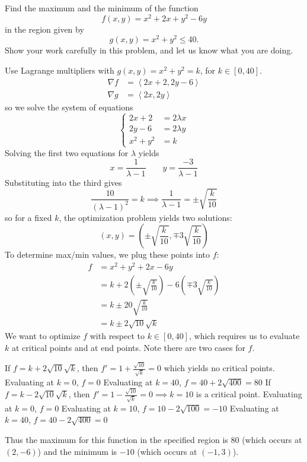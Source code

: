 \documentclass[12pt,answers]{exam}
\newcommand{\vect}[1]{\left\langle #1\right\rangle}
\begin{document}
\begin{questions}
	\newpage
	\question[20]
	Find the maximum and the minimum of the function
	\[
		f(x,y) = x^2 + 2x + y^2 - 6y
	\]
	in the region given by 
	\[
		g(x,y) = x^2 + y^2 \le 40.
	\]
	Show your work carefully in this problem, and let us know what you are doing.
	\begin{solution}
		Use Lagrange multipliers with $g(x,y) = x^2 + y^2 = k$, for $k \in [0, 40]$.
		\begin{align*}
			\nabla f &= \vect{2x + 2, 2y-6}\\
			\nabla g &= \vect{2x, 2y}
		\end{align*}
		so we solve the system of equations
		\[
			\left\{
				\begin{aligned}
					2x+2 &= 2\lambda x \\ 
					2y-6 &= 2\lambda y \\ 
					x^2 + y^2 &= k
				\end{aligned}
			\right.
		\]
		Solving the first two equations for $\lambda$ yields
		\[
			x = \frac{1}{\lambda - 1} \qquad y = \frac{-3}{\lambda-1}
		\]
		Substituting into the third gives 
		\[
			\frac{10}{(\lambda-1)^2} = k \implies \frac{1}{\lambda-1} = \pm \sqrt{\frac{k}{10}}
		\]
		so for a fixed $k$, the optimization problem yields two solutions:
		\[
			(x, y) = \left( \pm \sqrt{\frac{k}{10}}, \mp 3 \sqrt{\frac{k}{10}} \right)
		\]
		To determine max/min values, we plug these points into $f$:
		\begin{align*}
			f &= x^2 + y^2 + 2x - 6y \\
			&= k + 2\left(\pm \sqrt{\frac{k}{10}}\right) - 6\left( \mp 3 \sqrt{\frac{k}{10}} \right)  \\
			&= k \pm 20 \sqrt{\frac{k}{10}} \\
			&= k \pm 2 \sqrt{10}\sqrt{k}
		\end{align*}
		We want to optimize $f$ with respect to $k \in [0,40]$, which requires us to evaluate $k$ at critical points and at end points.
		Note there are two cases for $f$. 
		\begin{outline}
			\1 If $f = k + 2 \sqrt{10} \sqrt{k}$, then $f' = 1 + \frac{\sqrt{10}}{\sqrt k} = 0$ which yields no critical points. 
			\2 Evaluating at $k = 0$, $f = 0$
			\2 Evaluating at $k = 40$, $f = 40 + 2 \sqrt{400} = 80$
			\1 If $f = k -2 \sqrt{10} \sqrt{k}$, then $f' = 1 - \frac{\sqrt{10}}{\sqrt{k}} = 0 \implies k = 10$ is a critical point.
			\2 Evaluating at $k = 0$, $f = 0$
			\2 Evaluating at $k = 10$, $f = 10 - 2\sqrt{100} = -10$
			\2 Evaluating at $k = 40$, $f = 40 - 2 \sqrt{400} = 0$
		\end{outline}
		Thus the maximum for this function in the specified region is 80 (which occurs at $(2, -6)$) and the minimum is $-10$ (which occurs at $(-1, 3)$).
	\end{solution}


\end{questions}
\end{document}
